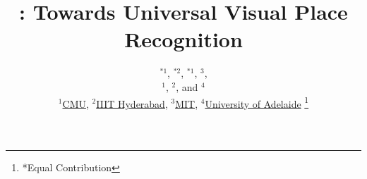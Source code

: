 \documentclass[letterpaper, 10 pt, conference]{ieeeconf}  \fi
\title{\LARGE \bf
\coolname: Towards Universal Visual Place Recognition \\
\Large{\href{\webpage}{\color{orange}{\webpage}}}
}
\author{
\authorhref{https://nik-v9.github.io/}{Nikhil Keetha}$^{*1}$, 
\authorhref{https://theprojectsguy.github.io/}{Avneesh Mishra}$^{*2}$, 
\authorhref{https://jaykarhade.github.io/}{Jay Karhade}$^{*1}$, 
\authorhref{https://krrish94.github.io/}{Krishna Murthy Jatavallabhula}$^{3}$,
\\
\authorhref{https://theairlab.org/team/sebastian/}{Sebastian Scherer}$^{1}$, 
\authorhref{https://robotics.iiit.ac.in/faculty_mkrishna/}{Madhava Krishna}$^{2}$, and 
\authorhref{https://researchers.adelaide.edu.au/profile/sourav.garg}{Sourav Garg}$^{4}$
\\[5 pt]
$^{1}$\href{https://www.ri.cmu.edu/}{CMU}, 
$^{2}$\href{https://robotics.iiit.ac.in//}{IIIT Hyderabad}, 
$^{3}$\href{https://www.csail.mit.edu/}{MIT}, 
$^{4}$\href{https://www.adelaide.edu.au/aiml/}{University of Adelaide}
\thanks{*Equal Contribution}}
\newcommand{\coolname}{\textit{AnyLoc}}
\begin{document}
\ifral
{}
\fi
\ifralfinal
{}
\fi


\makeatletter
\let\@oldmaketitle\@maketitle
\renewcommand{\@maketitle}{\@oldmaketitle
\centering
\begin{tabular}{cccc}
\texttt{[image: figures/splash/splash.pdf]}
\end{tabular}
\captionof{figure}{
\textbf{\coolname{}} enables \emph{universal} visual place recognition (VPR) across a massively diverse set of environments (\textit{anywhere}), temporal changes (\textit{anytime}), and a wide range of viewpoint variations (\textit{anyview}).
\coolname{} achieves this by aggregating per-pixel features extracted from large-scale pretrained models (\emph{foundation models}), \emph{without any training or finetuning}.
In the PCA panels (\emph{middle)}, notice how the features from MixVPR --- a state-of-the-art method trained specifically for VPR --- concentrate to a small region of the feature space, losing discriminative ability. On the other hand, \coolname{} uncovers 
distinct \textit{domains} encompassing datasets with similar properties, marked with the same color.
Using these \textit{domains} to construct vocabularies for unsupervised VLAD aggregation enables \coolname{} to achieve up to $4\times$ higher Recall@1, as seen in the polygonal areas in the radar chart (\textit{right}), across structured (urban outdoors, indoors) and unstructured (underwater, aerial, subterranean, visually degraded) environments.
}
\label{fig:splash}
}
\makeatother

\maketitle
\thispagestyle{empty}
\pagestyle{empty}
\end{document}
